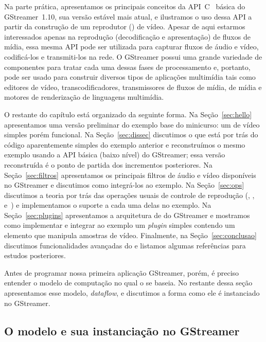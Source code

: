 \documentclass{SBCbookchapter}
\begin{document}
Na parte prática, apresentamos os principais conceitos da
API~C~\cite{Kernighan-B-W-1988} básica do GStreamer~1.10, sua versão estável
mais atual, e ilustramos o uso dessa API a partir da construção de um
reprodutor () de vídeo.  Apesar de aqui estarmos interessados
apenas na reprodução (decodificação e apresentação) de fluxos de mídia, essa
mesma API pode ser utilizada para capturar fluxos de áudio e vídeo,
codificá-los e transmiti-los na rede.  O GStreamer possui uma grande
variedade de componentes para tratar cada uma dessas fases de processamento
e, portanto, pode ser usado para construir diversos tipos de aplicações
multimídia tais como editores de vídeo, transcodificadores, transmissores de
fluxos de mídia,  de mídia e motores de renderização de
linguagens multimídia.

O restante do capítulo está organizado da seguinte forma.  Na
Seção~\ref{sec:hello} apresentamos uma versão preliminar do exemplo base do
minicurso: um  de vídeo simples porém funcional.  Na
Seção~\ref{sec:dissec} discutimos o que está por trás do código
aparentemente simples do exemplo anterior e reconstruímos o mesmo exemplo
usando a API básica (baixo nível) do GStreamer; essa versão reconstruída é o
ponto de partida dos incrementos posteriores.  Na Seção~\ref{sec:filtros}
apresentamos os principais filtros de áudio e vídeo disponíveis no GStreamer
e discutimos como integrá-los ao exemplo.  Na Seção~\ref{sec:ops} discutimos
a teoria por trás das operações usuais de controle de reprodução
(, ,  e~) e implementamos o
suporte a cada uma delas no exemplo.  Na Seção~\ref{sec:plugins}
apresentamos a arquitetura de  do GStreamer e mostramos como
implementar e integrar ao exemplo um \emph{plugin} simples contendo um
elemento que manipula amostras de vídeo.  Finalmente, na
Seção~\ref{sec:conclusao} discutimos funcionalidades avançadas do
 e listamos algumas referências para estudos posteriores.

Antes de programar nossa primeira aplicação GStreamer, porém, é preciso
entender o modelo de computação no qual o  se baseia.  No
restante dessa seção apresentamos esse modelo, \emph{dataflow}, e discutimos
a forma como ele é instanciado no GStreamer.


\subsection*{O modelo  e sua instanciação no GStreamer}
\end{document}
